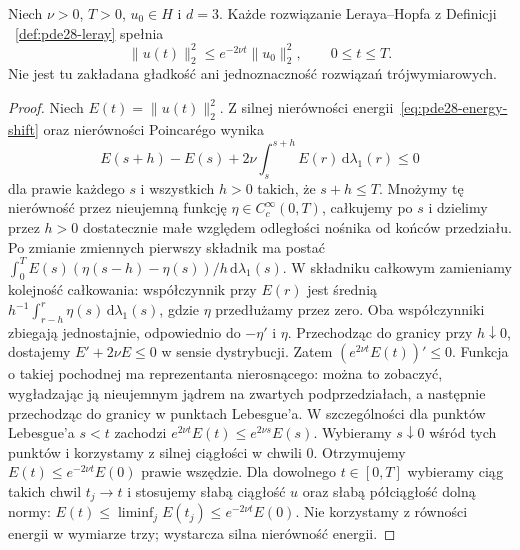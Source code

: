 \begin{wniosek}
\label{cor:pde28-decay-3d}
Niech $\nu>0$, $T>0$, $u_0\in H$ i $d=3$.
Każde rozwiązanie Leraya--Hopfa z Definicji
~\ref{def:pde28-leray} spełnia
\[
 \|u(t)\|_2^2\le e^{-2\nu t}\|u_0\|_2^2,
 \qquad 0\le t\le T.
\]
Nie jest tu zakładana gładkość ani jednoznaczność
rozwiązań trójwymiarowych.
\end{wniosek}
\begin{proof}
Niech $E(t)=\|u(t)\|_2^2$. Z silnej nierówności
energii~\eqref{eq:pde28-energy-shift} oraz
nierówności Poincarégo wynika
\[
 E(s+h)-E(s)+2\nu\int_s^{s+h}E(r)
 \,\mathrm d\lambda_1(r)\le0
\]
dla prawie każdego $s$ i wszystkich $h>0$
takich, że $s+h\le T$.
Mnożymy tę nierówność przez nieujemną funkcję
$\eta\in C_c^\infty(0,T)$, całkujemy po $s$
i dzielimy przez $h>0$ dostatecznie małe względem
odległości nośnika od końców przedziału.
Po zmianie zmiennych pierwszy składnik ma postać
$\int_0^T E(s)(\eta(s-h)-\eta(s))/h
\,\mathrm d\lambda_1(s)$.
W składniku całkowym zamieniamy kolejność
całkowania: współczynnik przy $E(r)$ jest średnią
$h^{-1}\int_{r-h}^r\eta(s)\,\mathrm d\lambda_1(s)$,
gdzie $\eta$ przedłużamy przez zero.
Oba współczynniki zbiegają jednostajnie,
odpowiednio do $-\eta'$ i $\eta$.
Przechodząc do granicy przy $h\downarrow0$,
dostajemy $E'+2\nu E\le0$ w sensie dystrybucji.
Zatem $(e^{2\nu t}E(t))'\le0$.
Funkcja o takiej pochodnej ma reprezentanta
nierosnącego: można to zobaczyć, wygładzając ją
nieujemnym jądrem na zwartych podprzedziałach,
a następnie przechodząc do granicy w punktach
Lebesgue'a. W szczególności dla punktów Lebesgue'a
$s<t$ zachodzi $e^{2\nu t}E(t)\le e^{2\nu s}E(s)$.
Wybieramy $s\downarrow0$ wśród tych punktów
i korzystamy z silnej ciągłości w chwili $0$.
Otrzymujemy $E(t)\le e^{-2\nu t}E(0)$ prawie wszędzie.
Dla dowolnego $t\in[0,T]$ wybieramy ciąg takich chwil
$t_j\to t$ i stosujemy słabą ciągłość $u$
oraz słabą półciągłość dolną normy:
$E(t)\le\liminf_j E(t_j)\le e^{-2\nu t}E(0)$.
Nie korzystamy z równości energii w wymiarze trzy;
wystarcza silna nierówność energii.
\end{proof}


